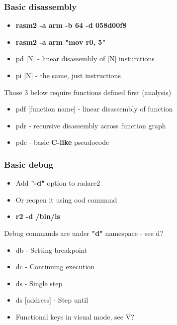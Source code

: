 \documentclass[10pt,pdf,utf8,english,compress,hyperref={unicode}]{beamer}
\begin{document}
\begin{frame}[fragile]
  \frametitle{Basic disassembly}
  \begin{itemize}
	  \item \textbf{rasm2 -a arm -b 64 -d 058d00f8}
	  \item \textbf{rasm2 -a arm "mov r0, 5"}
	  \item \alert{pd [N]} - linear disassembly of [N] insturctions
	  \item \alert{pi [N]} - the same, just instructions
  \end{itemize}
	  Those 3 below require functions defined first (analysis)
  \begin{itemize}
	  \item \alert{pdf [function name]} - linear disassembly of function
	  \item \alert{pdr} - recursive disassembly across function graph
	  \item \alert{pdc} - basic \textbf{C-like} pseudocode
  \end{itemize}
\end{frame}

\begin{frame}[fragile]
  \frametitle{Basic debug}
  \begin{itemize}
	  \item Add \textbf{"-d"} option to radare2
	  \item Or reopen it using \alert{ood} command
	  \item \textbf{r2 -d /bin/ls}
  \end{itemize}
  Debug commands are under \textbf{"d"} namespace - see \alert{d?}
  \begin{itemize}
	  \item \alert{db} - Setting breakpoint
	  \item \alert{dc} - Continuing execution
	  \item \alert{ds} - Single step
	  \item \alert{ds [address]} - Step until
	  \item Functional keys in visual mode, see \alert{V?}
  \end{itemize}
\end{frame}
\end{document}
